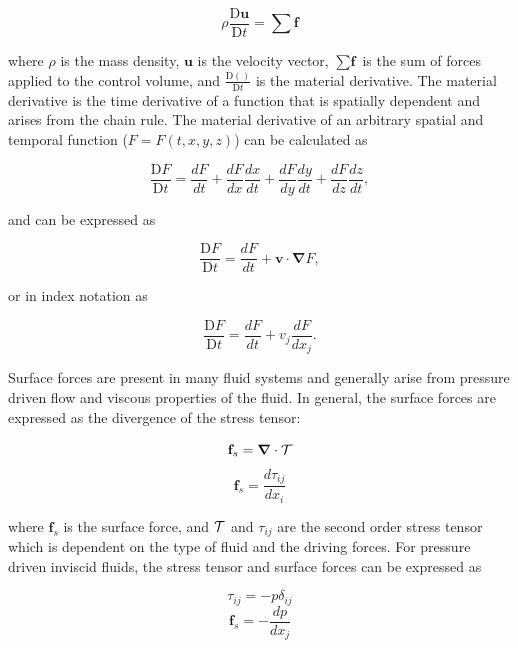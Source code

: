 \begin{equation}
    \rho \frac{\text{D}\textbf{u}}{\text{D}t} = \sum \textbf{f}
    \label{eqn:cons_momentum}
\end{equation}

\noindent where $\rho$ is the mass density, $\textbf{u}$ is the velocity vector, $\sum \textbf{f}$ is the sum of forces applied to the control volume, and $\frac{\text{D}()}{\text{D}t}$ is the material derivative. The material derivative is the time derivative of a function that is spatially dependent and arises from the chain rule. The material derivative of an arbitrary spatial and temporal function ($F = F(t,x,y,z)$) can be calculated as

\begin{equation}
    \frac{\text{D}F}{\text{D}t} = \frac{dF}{dt} + \frac{dF}{dx}\frac{dx}{dt} + \frac{dF}{dy}\frac{dy}{dt} + \frac{dF}{dz}\frac{dz}{dt},
\end{equation}

and can be expressed as 

\begin{equation}
    \frac{\text{D}F}{\text{D}t} = \frac{dF}{dt} + \textbf{v} \cdot \boldsymbol{\nabla}F,
\end{equation}

or in index notation as

\begin{equation}
    \frac{\text{D}F}{\text{D}t} = \frac{dF}{dt} + v_j\frac{dF}{dx_j}.
\end{equation}

\par Surface forces are present in many fluid systems and generally arise from pressure driven flow and viscous properties of the fluid. In general, the surface forces are expressed as the divergence of the stress tensor:

\begin{equation}
    \textbf{f}_s = \boldsymbol{\nabla} \cdot \mathcal{T}
\end{equation}
\begin{equation}
    \textbf{f}_s = \frac{d\tau_{ij}}{dx_i}
\end{equation}

\noindent where $\textbf{f}_s$ is the surface force, and $\mathcal{T}$ and $\tau_{ij}$ are the second order stress tensor which is dependent on the type of fluid and the driving forces. For pressure driven inviscid fluids, the stress tensor and surface forces can be expressed as 

\begin{equation}
    \tau_{ij} = -p\delta_{ij}
\end{equation}
\begin{equation}
    \textbf{f}_s = - \frac{dp}{dx_j}
\end{equation}

